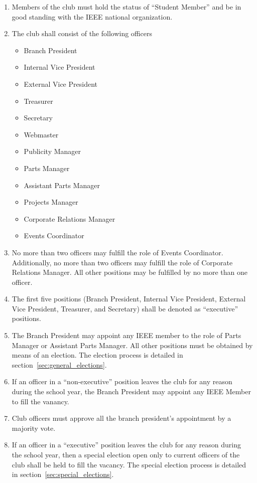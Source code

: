 \documentclass{article}
\begin{document}
\begin{enumerate}
\item Members of the club must hold the status of ``Student Member'' and be in good standing with the IEEE national organization.
\item The club shall consist of the following officers
  \begin{itemize}
    \item Branch President
    \item Internal Vice President
    \item External Vice President
    \item Treasurer
    \item Secretary
    \item Webmaster
    \item Publicity Manager
    \item Parts Manager 
    \item Assistant Parts Manager
    \item Projects Manager
    \item Corporate Relations Manager
    \item Events Coordinator
  \end{itemize}
\item No more than two officers may fulfill the role of Events Coordinator. Additionally, no more than two officers may fulfill the role of Corporate Relations Manager. All other positions may be fulfilled by no more than one officer.
\item The first five positions (Branch President, Internal Vice President, External Vice President, Treasurer, and Secretary) shall be denoted as ``executive'' positions. 
\item The Branch President may appoint any IEEE member to the role of Parts Manager or Assistant Parts Manager. All other positions must be obtained by means of an election. The election process is detailed in section~\ref{sec:general_elections}.
\item If an officer in a ``non-executive'' position leaves the club for any reason during the school year, the Branch President may appoint any IEEE Member to fill the vanancy.
\item Club officers must approve all the branch president's appointment by a majority vote.
\item If an officer in a ``executive'' position leaves the club for any reason during the school year, then a special election open only to current officers of the club shall be held to fill the vacancy. The special election process is detailed in section~\ref{sec:special_elections}.
\end{enumerate}
\end{document}
